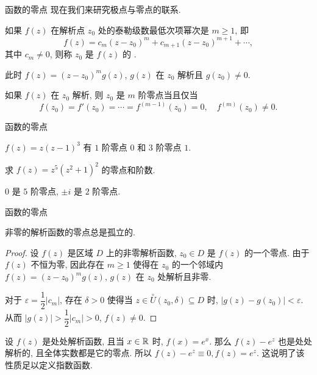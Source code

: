 \begin{frame}{函数的零点}
\onslide<+->
现在我们来研究极点与零点的联系.
\begin{definition}
如果 $f(z)$ 在解析点 $z_0$ 处的泰勒级数最低次项幂次是 $m\ge1$, 即
\[f(z)=c_m(z-z_0)^m+c_{m+1}(z-z_0)^{m+1}+\cdots,\]
其中 $c_m\neq 0$, 则称 $z_0$ 是 $f(z)$ 的 .
\end{definition}
\onslide<+->
此时 $f(z)=(z-z_0)^mg(z)$, $g(z)$ 在 $z_0$ 解析且 $g(z_0)\neq 0$.

\begin{theorem}
如果 $f(z)$ 在 $z_0$ 解析, 则 $z_0$ 是 $m$ 阶零点当且仅当
\[f(z_0)=f'(z_0)=\cdots=f^{(m-1)}(z_0)=0,\quad
f^{(m)}(z_0)\neq 0.\]
\end{theorem}
\end{frame}


\begin{frame}{函数的零点}
\begin{example}
$f(z)=z(z-1)^3$
\onslide<+->
有 $1$ 阶零点 $0$ 和 $3$ 阶零点 $1$.
\end{example}
\begin{exercise}
求 $f(z)=z^5(z^2+1)^2$ 的零点和阶数.
\end{exercise}
\begin{answer}
 $0$ 是 $5$ 阶零点, $\pm i$ 是 $2$ 阶零点.
\end{answer}
\end{frame}


\begin{frame}{函数的零点}
\begin{theorem}
非零的解析函数的零点总是孤立的.
\end{theorem}
\begin{proof}
\indent
设 $f(z)$ 是区域 $D$ 上的非零解析函数, $z_0\in D$ 是 $f(z)$ 的一个零点.
\onslide<+->
由于 $f(z)$ 不恒为零, 因此存在 $m\ge 1$ 使得在 $z_0$ 的一个邻域内 $f(z)=(z-z_0)^m g(z)$, $g(z)$ 在 $z_0$ 处解析且非零.

\indent
\onslide<+->
对于 $\varepsilon=\dfrac12|c_m|$, 存在 $\delta>0$ 使得当 $z\in \stackrel{\circ}{U}(z_0,\delta)\subseteq D$ 时, $|g(z)-g(z_0)|<\varepsilon$.
\onslide<+->
从而 $|g(z)|>\dfrac12|c_m|>0$, $f(z)\neq 0$.
\end{proof}

\onslide<+->
设 $f(z)$ 是处处解析函数, 且当 $x\in{\mathbb{R}}$ 时, $f(x)=e^x$.
\onslide<+->
那么 $f(z)-e^z$ 也是处处解析的, 且全体实数都是它的零点.
\onslide<+->
所以 $f(z)-e^z\equiv0,f(z)=e^z$.
\onslide<+->
这说明了该性质足以定义指数函数.
\end{frame}


